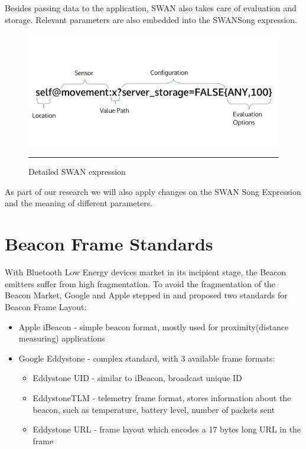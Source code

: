 Besides passing data to the application, SWAN also takes care of evaluation and storage. Relevant parameters are also embedded into the 
SWANSong expression.


\begin{figure}[htbp]
  \centering
    \includegraphics[scale=0.6]{Figures/swan_expr.pdf}
    \rule{35em}{0.5pt}
  \caption[Swan Expression]{Detailed SWAN expression}
  \label{fig:SwanExpression}
\end{figure}

As part of our research we will also apply changes on the SWAN Song Expression and the meaning of different parameters.

\section{Beacon Frame Standards}\label{Chapter3.2}
With Bluetooth Low Energy devices market in its incipient stage, the Beacon  emitters suffer from high fragmentation.
To avoid the fragmentation of the Beacon Market, Google and Apple stepped in and proposed two standards for Beacon Frame Layout:

\begin{itemize}
 \item Apple iBeacon - simple beacon format, mostly used for proximity(distance measuring) applications
 \item Google Eddystone - complex standard, with 3 available frame formats:
 \begin{itemize}
  \item Eddystone UID - similar to iBeacon, broadcast unique ID
  \item EddystoneTLM - telemetry frame format, stores information about the beacon, such as temperature, battery level, number of packets sent
  \item Eddystone URL - frame layout which encodes a 17 bytes long URL in the frame
 \end{itemize}
\end{itemize}

